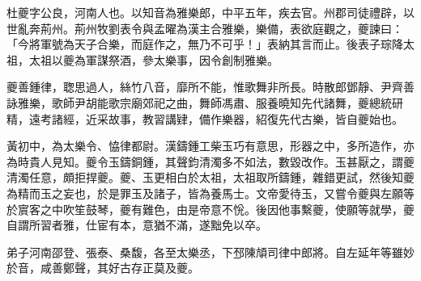 
\begin{pinyinscope}
杜夔字公良，河南人也。以知音為雅樂郎，中平五年，疾去官。州郡司徒禮辟，以世亂奔荊州。荊州牧劉表令與孟曜為漢主合雅樂，樂備，表欲庭觀之，夔諫曰：「今將軍號為天子合樂，而庭作之，無乃不可乎！」表納其言而止。後表子琮降太祖，太祖以夔為軍謀祭酒，參太樂事，因令創制雅樂。

夔善鍾律，聦思過人，絲竹八音，靡所不能，惟歌舞非所長。時散郎鄧靜、尹齊善詠雅樂，歌師尹胡能歌宗廟郊祀之曲，舞師馮肅、服養曉知先代諸舞，夔總統研精，遠考諸經，近采故事，教習講肄，備作樂器，紹復先代古樂，皆自夔始也。

黃初中，為太樂令、恊律都尉。漢鑄鍾工柴玉巧有意思，形器之中，多所造作，亦為時貴人見知。夔令玉鑄銅鍾，其聲鈞清濁多不如法，數毀改作。玉甚厭之，謂夔清濁任意，頗拒捍夔。夔、玉更相白於太祖，太祖取所鑄鍾，雜錯更試，然後知夔為精而玉之妄也，於是罪玉及諸子，皆為養馬士。文帝愛待玉，又嘗令夔與左願等於賔客之中吹笙鼓琴，夔有難色，由是帝意不恱。後因他事繫夔，使願等就學，夔自謂所習者雅，仕宦有本，意猶不滿，遂黜免以卒。

弟子河南邵登、張泰、桑馥，各至太樂丞，下邳陳頏司律中郎將。自左延年等雖妙於音，咸善鄭聲，其好古存正莫及夔。


\end{pinyinscope}
